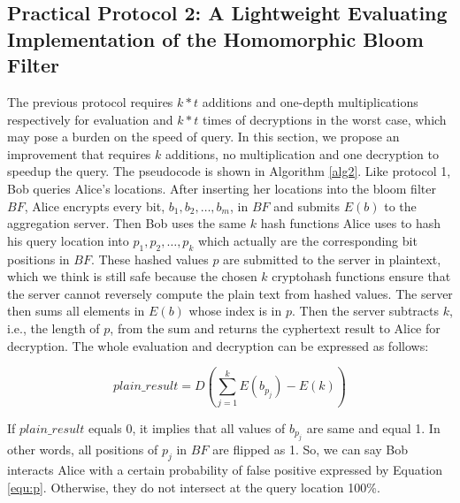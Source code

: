 \subsection{Practical Protocol 2: A Lightweight Evaluating Implementation of the Homomorphic Bloom Filter}
The previous protocol requires $k*t$ additions and one-depth multiplications respectively for evaluation and $k*t$ times of decryptions in the worst case, which may pose a burden on the speed of query. In this section, we propose an improvement that requires $k$ additions, no multiplication and one decryption to speedup the query. The pseudocode is shown in Algorithm \ref{alg2}. Like protocol 1, Bob queries Alice's locations. After inserting her locations into the bloom filter $BF$, Alice encrypts every bit, $b_1, b_2, \dots, b_m$, in $BF$ and submits $E(b)$ to the aggregation server. Then Bob uses the same $k$ hash functions Alice uses to hash his query location into $p_1, p_2, \dots, p_k$ which actually are the corresponding bit positions in $BF$. These hashed values $p$ are submitted to the server in plaintext, which we think is still safe because the chosen $k$ cryptohash functions ensure that the server cannot reversely compute the plain text from hashed values. The server then sums all elements in $E(b)$ whose index is in $p$. Then the server subtracts $k$, i.e., the length of $p$, from the sum and returns the cyphertext result to Alice for decryption. The whole evaluation and decryption can be expressed as follows:

\begin{equation}
plain\_result = D(\sum_{j = 1}^{k}E(b_{p_j}) - E(k))
\end{equation}

If $plain\_result$ equals 0, it implies that all values of $b_{p_j}$ are same and equal 1. In other words, all positions of $p_j$ in $BF$ are flipped as 1. So, we can say Bob interacts Alice with a certain probability of false positive expressed by Equation \ref{equ:p}. Otherwise, they do not intersect at the query location 100\%.

